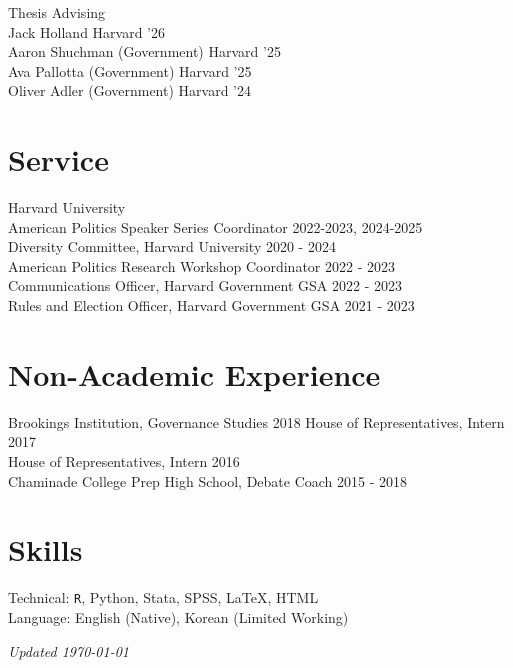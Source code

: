 \documentclass[margin, line]{res}
\begin{document}
\begin{resume}
\hspace*{2.5mm} Thesis Advising \\
\hspace*{5mm} Jack Holland \hfill Harvard '26\\
\hspace*{5mm} Aaron Shuchman (Government) \hfill Harvard '25\\
\hspace*{5mm} Ava Pallotta (Government) \hfill Harvard '25\\
\hspace*{5mm} Oliver Adler (Government) \hfill Harvard '24

\section{Service}
Harvard University\\
\hspace*{5mm} American Politics Speaker Series Coordinator \hfill 2022-2023, 2024-2025\\
\hspace*{5mm} Diversity Committee, Harvard University \hfill 2020 - 2024\\
\hspace*{5mm} American Politics Research Workshop Coordinator \hfill 2022 - 2023\\
\hspace*{5mm} Communications Officer, Harvard Government GSA \hfill 2022 - 2023\\
\hspace*{5mm} Rules and Election Officer, Harvard Government GSA \hfill 2021 - 2023\\

\section{Non-Academic Experience}
Brookings Institution, Governance Studies \hfill 2018
House of Representatives, Intern \hfill 2017\\
House of Representatives, Intern \hfill 2016\\
Chaminade College Prep High School, Debate Coach \hfill 2015 - 2018

\section{Skills}
Technical: \texttt{R}, Python, Stata, SPSS, \LaTeX, HTML\\
Language: English (Native), Korean (Limited Working)

\vspace*{\fill}

\hfill \small{\textit{Updated \today}}

\end{resume}
\end{document}
